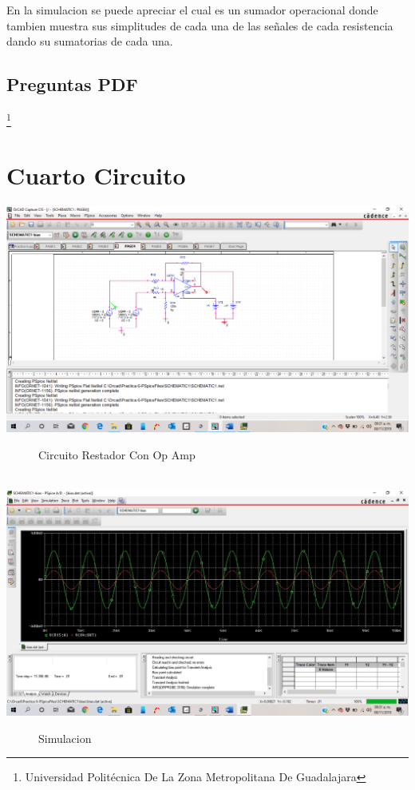 \documentclass[10pt,a4paper]{article}
\begin{document}
En la simulacion se puede apreciar el cual es un sumador operacional donde tambien muestra sus simplitudes de cada una de las señales de cada resistencia dando su sumatorias de cada una.








\subsection{Preguntas PDF}






\footnote{Universidad Politécnica De La Zona Metropolitana De Guadalajara} 

\newpage

\section{Cuarto Circuito}
\begin{center}
 \includegraphics[scale=0.3]{7.png}
 \begin{figure}[hbtp]
 \caption{Circuito Restador Con Op Amp}
 \centering
 \end{figure}\\
  \includegraphics[scale=0.3]{8.png}
 \begin{figure}[hbtp]
 \caption{Simulacion}
 \centering
 \end{figure} 
\end{center}
\end{document}
